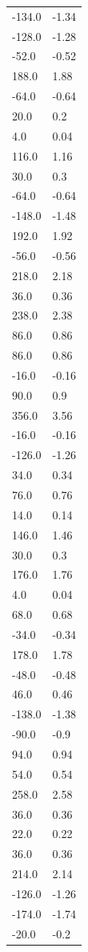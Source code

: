 \begin{longtable}{ll}
-134.0 & -1.34 \\
-128.0 & -1.28 \\
-52.0 & -0.52 \\
188.0 & 1.88 \\
-64.0 & -0.64 \\
20.0 & 0.2 \\
4.0 & 0.04 \\
116.0 & 1.16 \\
30.0 & 0.3 \\
-64.0 & -0.64 \\
-148.0 & -1.48 \\
192.0 & 1.92 \\
-56.0 & -0.56 \\
218.0 & 2.18 \\
36.0 & 0.36 \\
238.0 & 2.38 \\
86.0 & 0.86 \\
86.0 & 0.86 \\
-16.0 & -0.16 \\
90.0 & 0.9 \\
356.0 & 3.56 \\
-16.0 & -0.16 \\
-126.0 & -1.26 \\
34.0 & 0.34 \\
76.0 & 0.76 \\
14.0 & 0.14 \\
146.0 & 1.46 \\
30.0 & 0.3 \\
176.0 & 1.76 \\
4.0 & 0.04 \\
68.0 & 0.68 \\
-34.0 & -0.34 \\
178.0 & 1.78 \\
-48.0 & -0.48 \\
46.0 & 0.46 \\
-138.0 & -1.38 \\
-90.0 & -0.9 \\
94.0 & 0.94 \\
54.0 & 0.54 \\
258.0 & 2.58 \\
36.0 & 0.36 \\
22.0 & 0.22 \\
36.0 & 0.36 \\
214.0 & 2.14 \\
-126.0 & -1.26 \\
-174.0 & -1.74 \\
-20.0 & -0.2 \\

\end{longtable}
